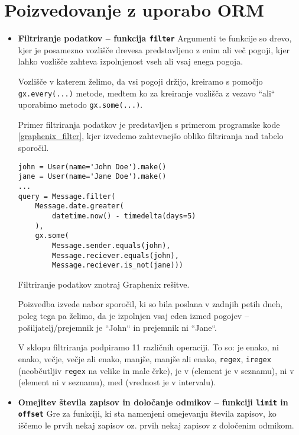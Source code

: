 \documentclass[a4paper,12pt,openright]{book}
\begin{document}
    \section{Poizvedovanje z uporabo ORM}
    \begin{itemize}
        \item \textbf{Filtriranje podatkov – funkcija {\tt filter}}
        \newline
        \noindent
        Argumenti te funkcije so drevo, kjer je posamezno vozlišče drevesa predstavljeno z enim ali več pogoji, kjer lahko vozlišče zahteva izpolnjenost vseh ali vsaj enega pogoja.
        
        Vozlišče v katerem želimo, da vsi pogoji držijo, kreiramo s pomočjo {\tt gx.every(...)} metode, medtem ko za kreiranje vozlišča z vezavo ``ali`` uporabimo metodo {\tt gx.some(...)}.

        Primer filtriranja podatkov je predstavljen s primerom programske kode \ref{graphenix_filter}, kjer izvedemo zahtevnejšo obliko filtriranja nad tabelo sporočil.

\begin{code}
\begin{verbatim}
john = User(name='John Doe').make()
jane = User(name='Jane Doe').make()
...
query = Message.filter(
    Message.date.greater(
        datetime.now() - timedelta(days=5)
    ),
    gx.some(
        Message.sender.equals(john),
        Message.reciever.equals(john),
        Message.reciever.is_not(jane)))
\end{verbatim}
\caption{Filtriranje podatkov znotraj Graphenix rešitve.}
\label{graphenix_filter}
\end{code}

        \noindent
        Poizvedba izvede nabor sporočil, ki so bila poslana v zadnjih petih dneh, poleg tega pa želimo, da je izpolnjen vsaj eden izmed pogojev – pošiljatelj/prejemnik je ``John`` in prejemnik ni ``Jane``.

        V sklopu filtriranja podpiramo 11 različnih operaciji. To so: je enako, ni enako, večje, večje ali enako, manjše, manjše ali enako, {\tt regex}, {\tt iregex} (neobčutljiv {\tt regex} na velike in male črke), je v (element je v seznamu), ni v (element ni v seznamu), med (vrednost je v intervalu).
        
        \item \textbf{Omejitev števila zapisov in določanje odmikov – funkciji {\tt limit} in {\tt offset}}
        \newline
        \noindent
        Gre za funkciji, ki sta namenjeni omejevanju števila zapisov, ko iščemo le prvih nekaj zapisov oz. prvih nekaj zapisov z določenim odmikom. 


\end{itemize}
\end{document}
